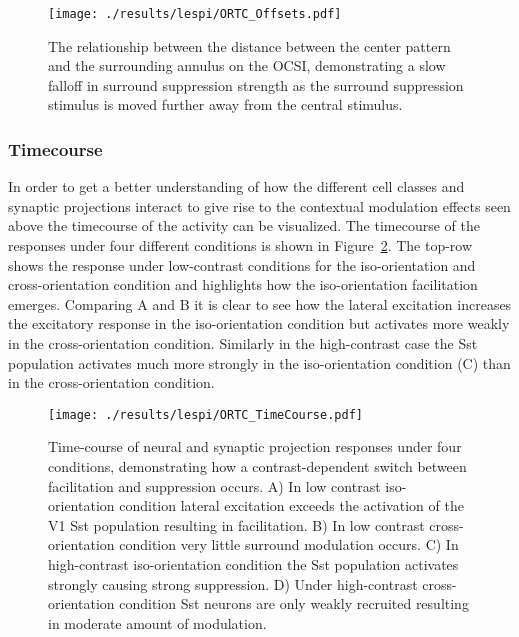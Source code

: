 \begin{figure}
	\centering
        \texttt{[image: ./results/lespi/ORTC\_Offsets.pdf]}
	\caption[Spatial dependence of surround suppression.]{The
      relationship between the distance between the center pattern and
      the surrounding annulus on the OCSI, demonstrating a slow
      falloff in surround suppression strength as the surround
      suppression stimulus is moved further away from the central stimulus.}
	\label{ORTC_OffsetCurve}
\end{figure}

\subsubsection{Timecourse}

In order to get a better understanding of how the different cell
classes and synaptic projections interact to give rise to the
contextual modulation effects seen above the timecourse of the
activity can be visualized. The timecourse of the responses under four
different conditions is shown in Figure~\ref{ORTC_TimeCourse}. The
top-row shows the response under low-contrast conditions for the
iso-orientation and cross-orientation condition and highlights how the
iso-orientation facilitation emerges. Comparing A and B it is clear to
see how the lateral excitation increases the excitatory response in
the iso-orientation condition but activates more weakly in the
cross-orientation condition. Similarly in the high-contrast case the
Sst population activates much more strongly in the iso-orientation
condition (C) than in the cross-orientation condition.

\begin{figure}
	\centering
        \texttt{[image: ./results/lespi/ORTC\_TimeCourse.pdf]}
	\caption[Time-course of neural and synaptic projection responses
      under four conditions, demonstrating how a contrast-dependent
      switch between facilitation and suppression occurs]{Time-course
      of neural and synaptic projection responses under four
      conditions, demonstrating how a contrast-dependent switch
      between facilitation and suppression occurs. A) In low contrast
      iso-orientation condition lateral excitation exceeds the
      activation of the V1 Sst population resulting in
      facilitation. B) In low contrast cross-orientation condition
      very little surround modulation occurs. C) In high-contrast
      iso-orientation condition the Sst population activates strongly
      causing strong suppression. D) Under high-contrast
      cross-orientation condition Sst neurons are only weakly
      recruited resulting in moderate amount of modulation.}
	\label{ORTC_TimeCourse}
\end{figure}

